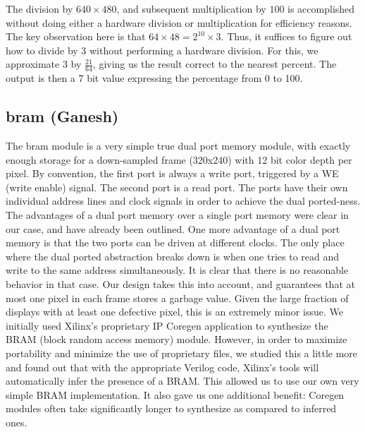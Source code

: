 \documentclass{article}
\begin{document}
The division by $640 \times 480$,
and subsequent multiplication by $100$ is accomplished without doing either a hardware division or multiplication for efficiency reasons.
The key observation here is that $64 \times 48 = 2^{10} \times 3$.
Thus, it suffices to figure out how to divide by $3$ without performing a hardware division.
For this, we approximate $3$ by $\frac{21}{64}$, giving us the result correct to the nearest percent.
The output is then a 7 bit value expressing the percentage from 0 to 100.

\subsection{bram (Ganesh)}
The bram module is a very simple true dual port memory module,
with exactly enough storage for a down-sampled frame (320x240) with 12 bit color depth per pixel.
By convention, the first port is always a write port, triggered by a WE (write enable) signal.
The second port is a read port.
The ports have their own individual address lines and clock signals in order to achieve the dual ported-ness.
The advantages of a dual port memory over a single port memory were clear in our case, and have already been outlined.
One more advantage of a dual port memory is that the two ports can be driven at different clocks.
The only place where the dual ported abstraction breaks down is when one tries to read and write to the same address simultaneously.
It is clear that there is no reasonable behavior in that case.
Our design takes this into account, and guarantees that at most one pixel in each frame stores a garbage value.
Given the large fraction of displays with at least one defective pixel, this is an extremely minor issue.
We initially used Xilinx's proprietary IP Coregen application to synthesize the BRAM (block random access memory) module.
However, in order to maximize portability and minimize the use of proprietary files,
we studied this a little more and found out that with the appropriate Verilog code, Xilinx's tools will automatically infer the presence of a BRAM.
This allowed us to use our own very simple BRAM implementation.
It also gave us one additional benefit: Coregen modules often take significantly longer to synthesize as compared to inferred ones.
\end{document}

